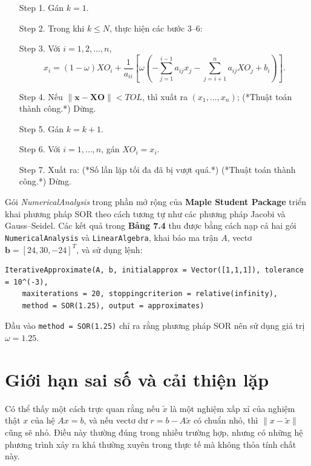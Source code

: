\begin{enumerate}
\item[Step 1.] Gán \( k = 1. \)
\item[Step 2.] Trong khi \( k \le N \), thực hiện các bước 3–6:
\item[Step 3.] Với \( i = 1, 2, \ldots, n \),
\[
x_i = (1 - \omega)XO_i + \frac{1}{a_{ii}}
\left[ 
\omega \left(
- \sum_{j=1}^{i-1} a_{ij}x_j 
- \sum_{j=i+1}^{n} a_{ij}XO_j
+ b_i
\right)
\right].
\]
\item[Step 4.] Nếu \( \|\mathbf{x} - \mathbf{XO}\| < TOL \), thì xuất ra \( (x_1, \ldots, x_n) \);  
\hspace{1cm} (*Thuật toán thành công.*)  
\hspace{1cm} Dừng.
\item[Step 5.] Gán \( k = k + 1. \)
\item[Step 6.] Với \( i = 1, \ldots, n \), gán \( XO_i = x_i. \)
\item[Step 7.] Xuất ra: (*Số lần lặp tối đa đã bị vượt quá.*)  
\hspace{1cm} (*Thuật toán thành công.*)  
\hspace{1cm} Dừng.
\end{enumerate}

Gói \textit{NumericalAnalysis} trong phần mở rộng của \textbf{Maple Student Package} 
triển khai phương pháp SOR theo cách tương tự như các phương pháp Jacobi và Gauss--Seidel.  
Các kết quả trong \textbf{Bảng 7.4} thu được bằng cách nạp cả hai gói \texttt{NumericalAnalysis} 
và \texttt{LinearAlgebra}, khai báo ma trận \( A \), 
vectơ \( \mathbf{b} = [24, 30, -24]^T \), 
và sử dụng lệnh:

\begin{verbatim}
IterativeApproximate(A, b, initialapprox = Vector([1,1,1]), tolerance = 10^(-3),
    maxiterations = 20, stoppingcriterion = relative(infinity), 
    method = SOR(1.25), output = approximates)
\end{verbatim}

Đầu vào \texttt{method = SOR(1.25)} chỉ ra rằng phương pháp SOR nên sử dụng giá trị 
\( \omega = 1.25 \).


\section{Giới hạn sai số và cải thiện lặp}

Có thể thấy một cách trực quan rằng nếu \( \tilde{x} \) là một nghiệm xấp xỉ của nghiệm thật \( x \) 
của hệ \( A x = b \), và nếu vectơ dư \( r = b - A\tilde{x} \) có chuẩn nhỏ, 
thì \( \|x - \tilde{x}\| \) cũng sẽ nhỏ. 
Điều này thường đúng trong nhiều trường hợp, nhưng có những hệ phương trình 
xảy ra khá thường xuyên trong thực tế mà không thỏa tính chất này.

